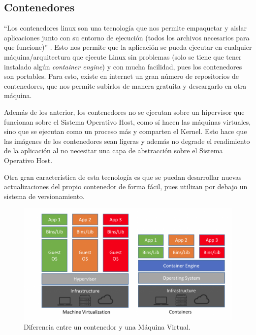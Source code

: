 \subsection{Contenedores}

\enquote{Los contenedores linux son una tecnología que nos permite empaquetar y aislar aplicaciones junto con su entorno de ejecución (todos los archivos necesarios para que funcione)} \cite{containers}. Esto nos permite que la aplicación se pueda ejecutar en cualquier máquina/arquitectura que ejecute Linux sin problemas (solo se tiene que tener instalado algún \textit{container engine}) y con mucha facilidad, pues los contenedores son portables. Para esto, existe en internet un gran número de repositorios de contenedores, que  nos permite subirlos de manera gratuita y descargarlo en otra máquina.\newline

Además de los anterior, los contenedores no se ejecutan sobre un hipervisor que funcionan sobre el Sistema Operativo Host, como sí hacen las máquinas virtuales, sino que se ejecutan como un proceso más y comparten el Kernel. Esto hace que las imágenes de los contenedores sean ligeras y además no degrade el rendimiento de la aplicación al no necesitar una capa de abstracción sobre el Sistema Operativo Host.\newline

Otra gran característica de esta tecnología es que se puedan desarrollar nuevas actualizaciones del propio contenedor de forma fácil, pues utilizan por debajo un sistema de versionamiento.

\begin{figure}[H]
	\includegraphics[scale=0.3]{imagenes/03_Estado_del_arte/containers.png}
	\centering
	\caption{Diferencia entre un contenedor y una Máquina Virtual.}
\end{figure}

